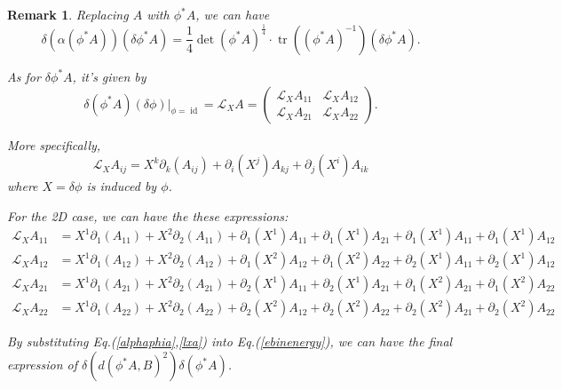 \documentclass{article}
\theoremstyle{definition}
\theoremstyle{plain}
\newtheorem{remark}{Remark}
\begin{document}
\begin{remark}
Replacing $A$ with $\phi^*A$, we can have
\begin{equation}
    \delta(\alpha(\phi^*A))(\delta \phi^*A)=\frac{1}{4}\operatorname{det}(\phi^*A)^{\frac{1}{4}}\cdot\operatorname{tr}((\phi^*A)^{-1})(\delta \phi^*A).\label{alphaphia}
\end{equation}

As for $\delta \phi^*A$, it's given by
\begin{equation}
    \delta(\phi^*A)(\delta\phi)\bigg\rvert_{\phi=\operatorname{id}}=\mathcal{L}_XA=\begin{pmatrix}\mathcal{L}_XA_{11}&\mathcal{L}_XA_{12}\\\mathcal{L}_XA_{21}&\mathcal{L}_XA_{22}\end{pmatrix}.\label{lxa}
\end{equation}

More specifically,
\begin{equation*}
    \mathcal{L}_XA_{ij}=X^k\partial_k(A_{ij})+\partial_i(X^j)A_{kj}+\partial_j(X^i)A_{ik}
\end{equation*}
where $X=\delta\phi$ is induced by $\phi$.

For the 2D case, we can have the these expressions:
\begin{align*}
    \mathcal{L}_XA_{11}&=X^1\partial_1(A_{11})+X^2\partial_2(A_{11})+\partial_1(X^1)A_{11}+\partial_1(X^1)A_{21}+\partial_1(X^1)A_{11}+\partial_1(X^1)A_{12}\\
    \mathcal{L}_XA_{12}&=X^1\partial_1(A_{12})+X^2\partial_2(A_{12})+\partial_1(X^2)A_{12}+\partial_1(X^2)A_{22}+\partial_2(X^1)A_{11}+\partial_2(X^1)A_{12}\\
    \mathcal{L}_XA_{21}&=X^1\partial_1(A_{21})+X^2\partial_2(A_{21})+\partial_2(X^1)A_{11}+\partial_2(X^1)A_{21}+\partial_1(X^2)A_{21}+\partial_1(X^2)A_{22}\\
    \mathcal{L}_XA_{22}&=X^1\partial_1(A_{22})+X^2\partial_2(A_{22})+\partial_2(X^2)A_{12}+\partial_2(X^2)A_{22}+\partial_2(X^2)A_{21}+\partial_2(X^2)A_{22}
\end{align*}

By substituting Eq.(\ref{alphaphia},\ref{lxa}) into Eq.(\ref{ebinenergy}), we can have the final expression of $\delta\left(d(\phi^*A,B)^2\right)\delta(\phi^* A)$.


\end{remark}
\end{document}
